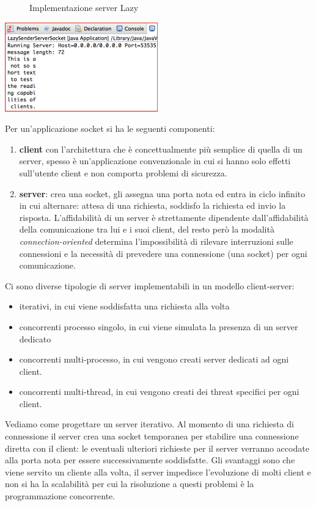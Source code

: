 \documentclass[a4paper,12pt, oneside]{book}
\begin{document}
\begin{figure}
    \caption{Implementazione server Lazy}
    \label{java:lazyServer}
    \inputminted{java}{code/JavaSocket/ServerWriter/LazySenderServerSocket.java}
\end{figure}

\begin{center}
	\includegraphics[scale=0.7]{img/lazy.png}
\end{center}
Per un'applicazione socket si ha le seguenti componenti:
\begin{enumerate}
	\item \textbf{client} con l'architettura che è concettualmente più semplice di quella di un server,
        spesso è un'applicazione convenzionale in cui si hanno solo effetti sull'utente client 
        e non comporta problemi di sicurezza.
	\item \textbf{server}: crea una socket, gli assegna una porta nota ed entra in ciclo infinito 
        in cui alternare: attesa di una richiesta, soddisfo la richiesta ed invio la risposta.\newline
	    L'affidabilità di un server è strettamente dipendente dall'affidabilità della comunicazione 
        tra lui e i suoi client, del resto però la modalità \textit{connection-oriented} determina 
        l'impossibilità di rilevare interruzioni sulle connessioni e la necessità di prevedere 
        una connessione (una socket) per ogni comunicazione.
\end{enumerate}
Ci sono diverse tipologie di server implementabili in un modello client-server:
\begin{itemize}
	\item iterativi, in cui viene soddisfatta una richiesta alla volta
	\item concorrenti processo singolo, in cui viene simulata la presenza di un server dedicato
	\item concorrenti multi-processo, in cui vengono creati server dedicati ad ogni client.
	\item concorrenti multi-thread, in cui vengono creati dei threat specifici per ogni client.
\end{itemize}
Vediamo come progettare un server iterativo. Al momento di una richiesta di connessione il server crea una
socket temporanea per stabilire una connessione diretta con il client: le eventuali ulteriori richieste
per il server verranno accodate alla porta nota per essere successivamente soddisfatte.\newline
Gli svantaggi sono che viene servito un cliente alla volta, il server impedisce l'evoluzione di molti
client e non si ha la scalabilità per cui la risoluzione a questi problemi è la programmazione concorrente.
\end{document}
